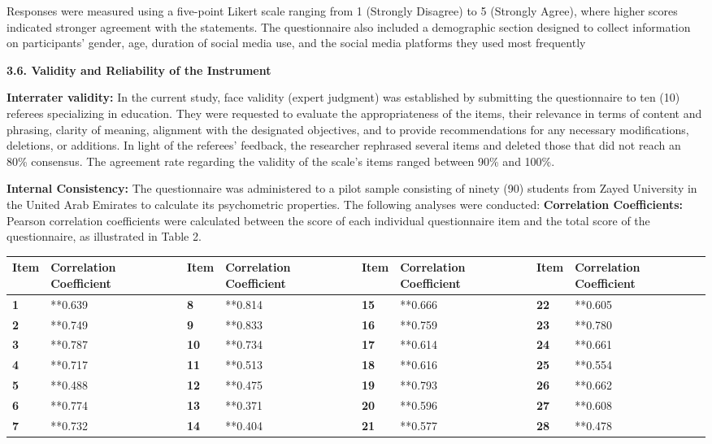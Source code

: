 \documentclass[11pt,a4paper]{article}
\begin{document}
	Responses were measured using a five-point Likert scale ranging from 1 (Strongly Disagree) to 5 (Strongly Agree), where higher scores indicated stronger agreement with the statements. The questionnaire also included a demographic section designed to collect information on participants' gender, age, duration of social media use, and the social media platforms they used most frequently
	
	\textbf{3.6. Validity and Reliability of the Instrument}
	
	\textbf{Interrater validity:} In the current study, face validity (expert judgment) was established by submitting the questionnaire to ten (10) referees specializing in education. They were requested to evaluate the appropriateness of the items, their relevance in terms of content and phrasing, clarity of meaning, alignment with the designated objectives, and to provide recommendations for any necessary modifications, deletions, or additions. In light of the referees' feedback, the researcher rephrased several items and deleted those that did not reach an 80\% consensus. The agreement rate regarding the validity of the scale's items ranged between 90\% and 100\%.
	
	\textbf{Internal Consistency: }The questionnaire was administered to a pilot sample consisting of ninety (90) students from Zayed University in the United Arab Emirates to calculate its psychometric properties. The following analyses were conducted:\textbf{ Correlation Coefficients:} Pearson correlation coefficients were calculated between the score of each individual questionnaire item and the total score of the questionnaire, as illustrated in Table 2.
	
	\begin{table}[h]
		\centering
		\begin{tabular}{|l|l|l|l|l|l|l|l|}
			\hline
			\textbf{Item} & Correlation Coefficient & \textbf{Item} & Correlation Coefficient & \textbf{Item} & Correlation Coefficient & \textbf{Item} & Correlation Coefficient \\ \hline
			\textbf{1} & **0.639 & \textbf{8} & **0.814 & \textbf{15} & **0.666 & \textbf{22} & **0.605 \\ \hline
			\textbf{2} & **0.749 & \textbf{9} & **0.833 & \textbf{16} & **0.759 & \textbf{23} & **0.780 \\ \hline
			\textbf{3} & **0.787 & \textbf{10} & **0.734 & \textbf{17} & **0.614 & \textbf{24} & **0.661 \\ \hline
			\textbf{4} & **0.717 & \textbf{11} & **0.513 & \textbf{18} & **0.616 & \textbf{25} & **0.554 \\ \hline
			\textbf{5} & **0.488 & \textbf{12} & **0.475 & \textbf{19} & **0.793 & \textbf{26} & **0.662 \\ \hline
			\textbf{6} & **0.774 & \textbf{13} & **0.371 & \textbf{20} & **0.596 & \textbf{27} & **0.608 \\ \hline
			\textbf{7} & **0.732 & \textbf{14} & **0.404 & \textbf{21} & **0.577 & \textbf{28} & **0.478 \\ \hline
		\end{tabular}
	\end{table}
	
\end{document}
